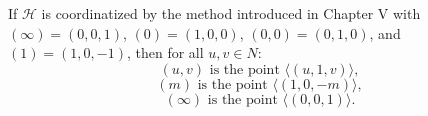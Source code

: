 If $\mathcal{H}$ is coordinatized by the method introduced in Chapter V with $(\infty) = (0,0,1)$, $(0) = (1,0,0)$, $(0,0) = (0,1,0)$, and $(1) = (1,0,-1)$, then for all $u, v \in N$:
$$(u, v) \text{ is the point } \langle (u, 1, v) \rangle,$$
$$(m) \text{ is the point } \langle (1, 0, -m) \rangle,$$
$$(\infty) \text{ is the point } \langle (0, 0, 1) \rangle.$$
